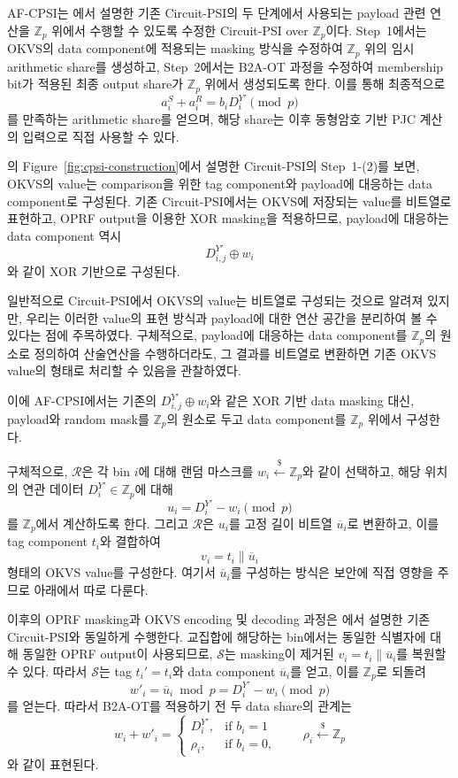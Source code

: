 \documentclass[sigconf,anonymous,review]{acmart}
\begin{document}
AF-CPSI는 에서 설명한 기존 Circuit-PSI의 두 단계에서 사용되는
payload 관련 연산을 $\mathbb{Z}_p$ 위에서 수행할 수 있도록 수정한
Circuit-PSI over $\mathbb{Z}_p$이다.
Step~1에서는 OKVS의 data component에 적용되는 masking 방식을 수정하여
$\mathbb{Z}_p$ 위의 임시 arithmetic share를 생성하고,
Step~2에서는 B2A-OT 과정을 수정하여 membership bit가 적용된
최종 output share가 $\mathbb{Z}_p$ 위에서 생성되도록 한다.
이를 통해 최종적으로
\[
a_i^S+a_i^R=b_iD_i^{Y'}\pmod p
\]
를 만족하는 arithmetic share를 얻으며,
해당 share는 이후 동형암호 기반 PJC 계산의 입력으로 직접 사용할 수 있다.


의 Figure~\ref{fig:cpsi-construction}에서 설명한
Circuit-PSI의 Step~1-(2)를 보면, OKVS의 value는
comparison을 위한 tag component와 payload에 대응하는
data component로 구성된다. 
기존 Circuit-PSI에서는 OKVS에 저장되는 value를 비트열로 표현하고,
OPRF output을 이용한 XOR masking을 적용하므로,
payload에 대응하는 data component 역시
\[
    D_{i,j}^{Y'}\oplus w_i
\]
와 같이 XOR 기반으로 구성된다.

일반적으로 Circuit-PSI에서 OKVS의 value는 비트열로 구성되는 것으로
알려져 있지만, 
우리는 이러한 value의 표현 방식과 payload에 대한
연산 공간을 분리하여 볼 수 있다는 점에 주목하였다.
구체적으로, payload에 대응하는 data component를
$\mathbb{Z}_p$의 원소로 정의하여 산술연산을 수행하더라도,
그 결과를 비트열로 변환하면 기존 OKVS value의 형태로
처리할 수 있음을 관찰하였다.

이에 AF-CPSI에서는 기존의
$D_{i,j}^{Y'}\oplus w_i$와 같은 XOR 기반 data masking 대신,
payload와 random mask를 $\mathbb{Z}_p$의 원소로 두고
data component를 $\mathbb{Z}_p$ 위에서 구성한다.

구체적으로, $\mathcal{R}$은 각 bin \(i\)에 대해 랜덤 마스크를 $w_i\overset{\$}{\leftarrow}\mathbb Z_p$와 같이 선택하고, 해당 위치의 연관 데이터 \(D_i^{Y'}\in\mathbb Z_p\)에 대해
\[
u_i=D_i^{Y'}-w_i\pmod p
\]
를 \(\mathbb{Z}_p\)에서 계산하도록 한다. 그리고 $\mathcal{R}$은 \(u_i\)를
고정 길이 비트열 \(\overline{u}_i\)로 변환하고, 이를 tag
component \(t_i\)와 결합하여
\[
v_i=t_i\parallel\overline{u}_i
\]
형태의 OKVS value를 구성한다.
여기서 $\overline{u}_i$를 구성하는 방식은 보안에 직접 영향을 주므로 아래에서
따로 다룬다.

이후의 OPRF masking과 OKVS encoding 및 decoding 과정은
에서 설명한 기존 Circuit-PSI와 동일하게 수행한다.
교집합에 해당하는 bin에서는 동일한 식별자에 대해 동일한
OPRF output이 사용되므로, $\mathcal{S}$는 masking이 제거된
$v_i=t_i\parallel\overline{u}_i$를 복원할 수 있다.
따라서 $\mathcal{S}$는 tag $t_i'=t_i$와
data component $\overline{u}_i$를 얻고,
이를 \(\mathbb{Z}_p\)로 되돌려
\[
 w'_i=\overline{u}_i \bmod p=D_i^{Y'}-w_i\pmod p
\]
를 얻는다. 따라서 B2A-OT를 적용하기 전 두 data share의 관계는
\[
w_i+w'_i=
\begin{cases}
D_i^{Y'}, & \text{if } b_i=1\\
\rho_i, & \text{if } b_i=0,
\end{cases}
\qquad
\rho_i\overset{\$}{\leftarrow}\mathbb Z_p
\]
와 같이 표현된다.
\end{document}
